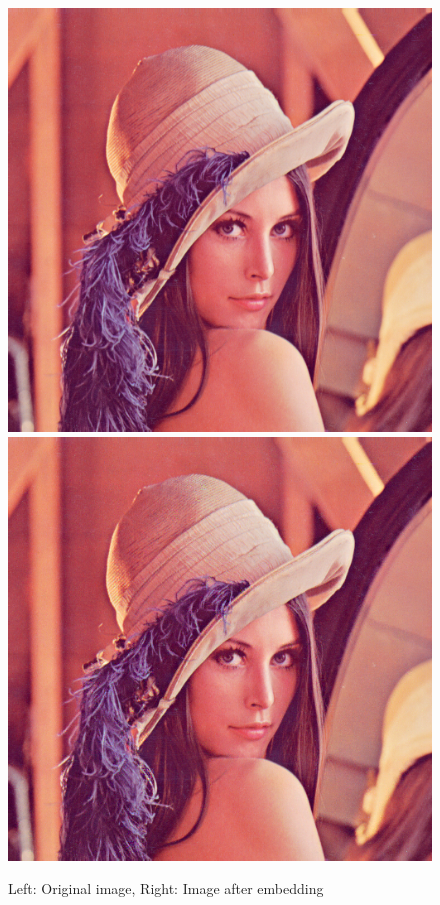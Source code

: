 \documentclass[12pt]{article}
\begin{document}
\begin{figure}[h]
\centerline{%
\includegraphics[scale=0.45]{"lena"}%
\hspace{0.1cm}
\includegraphics[scale=0.45]{"Lena Embed once 0.7 threshold/finalImage"}%
}%
\caption{Left: Original image, Right: Image after embedding}
\label{fig:lenaEmbedOnceEmbedding}
\end{figure}
\end{document}
